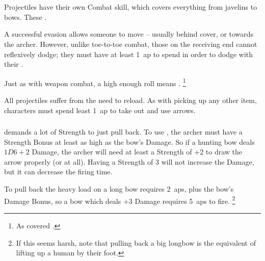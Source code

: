 
\section{}

\begin{multicols}{2}

\noindent
Projectiles have their own Combat \gls{skill}, which covers everything from javelins to bows.
These .

A successful evasion allows someone to move -- usually behind cover, or towards the archer.
However, unlike toe-to-toe combat, those on the receiving end cannot reflexively dodge; they must have at least 1~\gls{ap} to spend in order to dodge with their .

Just as with weapon combat, a high enough roll means .
\footnote{As covered .}

All projectiles suffer from the need to reload.
As with picking up any other item, characters must spend least 1~\gls{ap} to take out and use arrows.

\subsubsection{}
\label{longbow}
demands a lot of Strength to just pull back.
To use , the archer must have a Strength Bonus at least as high as the bow's Damage.
So if a hunting bow deals $1D6+2$ Damage, the archer will need at least a Strength of +2 to draw the arrow properly (or at all).
Having a Strength of 3 will not increase the Damage, but it can decrease the firing time.

To pull back the heavy load on a long bow requires 2~\glspl{ap}, plus the bow's Damage Bonus, so a bow which deals +3 Damage requires 5~\glspl{ap} to fire.%
\footnote{If this seems harsh, note that pulling back a big longbow is the equivalent of lifting up a human by their foot.}


\end{multicols}
